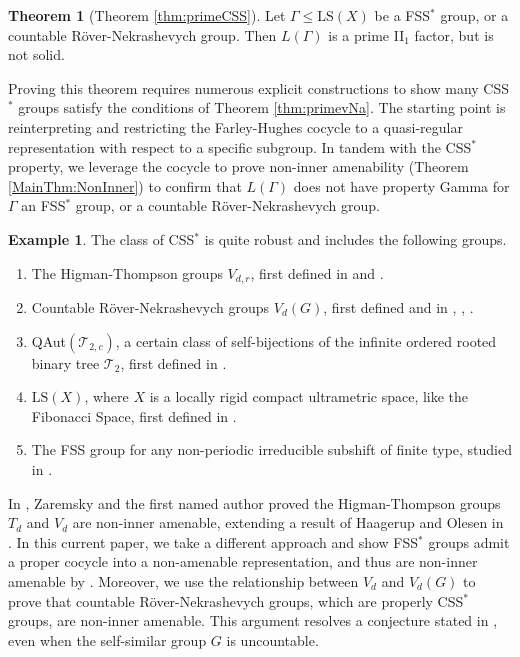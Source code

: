\documentclass[12pt]{amsart}
\numberwithin{equation}{subsection}
\theoremstyle{definition}
\newtheorem{introthm}{Theorem}
\theoremstyle{definition}
\newtheorem{example}[theorem]{Example}
\theoremstyle{remark}
\begin{document}
\begin{introthm}[Theorem \ref{thm:primeCSS}]\label{mainthm:PrimeCSS}
    Let $\Gamma \leq \text{LS}(X)$ be a FSS$^*$ group, or a countable R\"{o}ver-Nekrashevych group. Then $L(\Gamma)$ is a prime II$_1$ factor, but is not solid.
\end{introthm}

Proving this theorem requires numerous explicit constructions to show many CSS$^*$ groups satisfy the conditions of Theorem \ref{thm:primevNa}. The starting point is reinterpreting and restricting the Farley-Hughes cocycle to a quasi-regular representation with respect to a specific subgroup. In tandem with the CSS$^*$ property, we leverage the cocycle to prove non-inner amenability (Theorem \ref{MainThm:NonInner}) to confirm that $L(\Gamma)$ does not have property Gamma for $\Gamma$ an FSS$^*$ group, or a countable R\"{o}ver-Nekrashevych group.


\begin{example}\label{ex:introCSS} The class of CSS$^*$ is quite robust and includes the following groups. 
\begin{enumerate}
    \item The Higman-Thompson groups $V_{d,r}$, first defined in \cite{higman1974finitely} and \cite{brown1987finiteness}. 
    \item Countable R\"{o}ver-Nekrashevych groups $V_d(G)$, first defined and in \cite{scott1984construction}, \cite{rover1999constructing}, \cite{nekrashevych2004cuntz}.
    \item QAut$(\mathcal T_{2,c})$, a certain class of self-bijections of the infinite ordered rooted binary tree $\mathcal T_2$, first defined in \cite{lehnert2008gruppen}.
    \item $\text{LS}(X)$, where $X$ is a locally rigid compact ultrametric space, like the Fibonacci Space, first defined in \cite{hughes2009}. 
    \item The FSS group for any non-periodic irreducible subshift of finite type, studied in \cite{Matui20215SFT}. 
\end{enumerate}
    
\end{example}

In \cite{bashwinger2022non}, Zaremsky and the first named author proved the Higman-Thompson groups $T_d$ and $V_d$ are non-inner amenable, extending a result of Haagerup and Olesen in \cite{HO2016}. In this current paper, we take a different approach and show FSS$^*$ groups admit a proper cocycle into a non-amenable representation, and thus are non-inner amenable by \cite[Proposition 2.1]{ozawapopa2010cartanII}. Moreover, we use the relationship between $V_d$ and $V_d(G)$ to prove that countable R\"{o}ver-Nekrashevych groups, which are properly CSS$^*$ groups, are non-inner amenable. This argument resolves a conjecture stated in \cite{bashwinger2022non}, even when the self-similar group $G$ is uncountable. 
\end{document}
